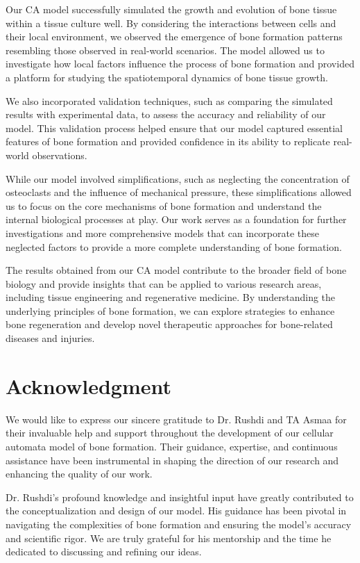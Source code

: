 \documentclass[conference]{IEEEtran}
\begin{document}
Our CA model successfully simulated the growth and evolution of bone tissue within a tissue culture well. By considering the interactions between cells and their local environment, we observed the emergence of bone formation patterns resembling those observed in real-world scenarios. The model allowed us to investigate how local factors influence the process of bone formation and provided a platform for studying the spatiotemporal dynamics of bone tissue growth.

We also incorporated validation techniques, such as comparing the simulated results with experimental data, to assess the accuracy and reliability of our model. This validation process helped ensure that our model captured essential features of bone formation and provided confidence in its ability to replicate real-world observations.

While our model involved simplifications, such as neglecting the concentration of osteoclasts and the influence of mechanical pressure, these simplifications allowed us to focus on the core mechanisms of bone formation and understand the internal biological processes at play. Our work serves as a foundation for further investigations and more comprehensive models that can incorporate these neglected factors to provide a more complete understanding of bone formation.

The results obtained from our CA model contribute to the broader field of bone biology and provide insights that can be applied to various research areas, including tissue engineering and regenerative medicine. By understanding the underlying principles of bone formation, we can explore strategies to enhance bone regeneration and develop novel therapeutic approaches for bone-related diseases and injuries.


\section*{Acknowledgment}
We would like to express our sincere gratitude to Dr. Rushdi and TA Asmaa for their invaluable help and support throughout the development of our cellular automata model of bone formation. Their guidance, expertise, and continuous assistance have been instrumental in shaping the direction of our research and enhancing the quality of our work.

Dr. Rushdi's profound knowledge and insightful input have greatly contributed to the conceptualization and design of our model. His guidance has been pivotal in navigating the complexities of bone formation and ensuring the model's accuracy and scientific rigor. We are truly grateful for his mentorship and the time he dedicated to discussing and refining our ideas.
\end{document}
